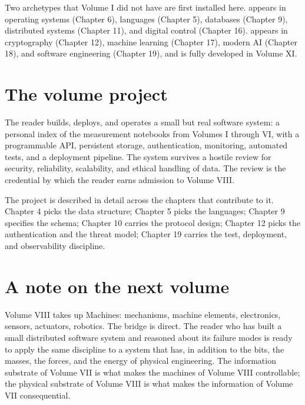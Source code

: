 Two archetypes that Volume I did not have are first installed here.  appears in operating systems (Chapter 6), languages (Chapter 5), databases (Chapter 9), distributed systems (Chapter 11), and digital control (Chapter 16).  appears in cryptography (Chapter 12), machine learning (Chapter 17), modern AI (Chapter 18), and software engineering (Chapter 19), and is fully developed in Volume XI.

\section*{The volume project}

The reader builds, deploys, and operates a small but real software system: a personal index of the measurement notebooks from Volumes I through VI, with a programmable API, persistent storage, authentication, monitoring, automated tests, and a deployment pipeline. The system survives a hostile review for security, reliability, scalability, and ethical handling of data. The review is the credential by which the reader earns admission to Volume VIII.

The project is described in detail across the chapters that contribute to it. Chapter 4 picks the data structure; Chapter 5 picks the languages; Chapter 9 specifies the schema; Chapter 10 carries the protocol design; Chapter 12 picks the authentication and the threat model; Chapter 19 carries the test, deployment, and observability discipline.

\section*{A note on the next volume}

Volume VIII takes up Machines: mechanisms, machine elements, electronics, sensors, actuators, robotics. The bridge is direct. The reader who has built a small distributed software system and reasoned about its failure modes is ready to apply the same discipline to a system that has, in addition to the bits, the masses, the forces, and the energy of physical engineering. The information substrate of Volume VII is what makes the machines of Volume VIII controllable; the physical substrate of Volume VIII is what makes the information of Volume VII consequential.

\vspace{1cm}
